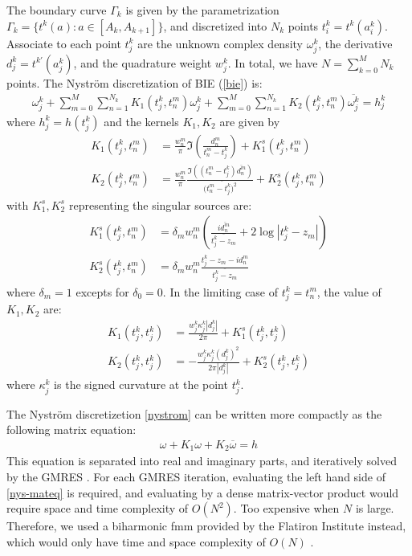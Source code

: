 \documentclass[10pt,twocolumn]{article}
\begin{document}
The boundary curve $\Gamma_k$ is given by the parametrization $\Gamma_k = \{ t^k(a): a\in \left[A_k,A_{k+1}\right]\}$, 
and discretized into $N_k$ points $t^k_i = t^k(a^k_i)$. 
Associate to each point $t^k_j$ are the unknown complex density $\omega^k_j$, 
the derivative $d^k_j = t^{k\prime}(a^k_j)$, 
and the quadrature weight $w^k_j$. In total, we have $N= \sum_{k=0}^M N_k$ points. The Nystr\"om discretization of BIE (\ref{bie}) is:
\begin{align}
  \omega_j^k 
  + \sum_{m=0}^{M}\sum_{n=1}^{N_k} K_1(t^k_j,t^m_n) \omega^k_j 
  + \sum_{m=0}^{M}\sum_{n=1}^{N_k} K_2(t^k_j,t^m_n) \overline{\omega^k_j} = h^k_j
  \label{nystrom}
\end{align} where $h^k_j = h(t^k_j)$ and the kernels $K_1, K_2$ are given by 
\begin{align}
  K_1(t^k_j, t^m_n) 
  &= \frac{w^m_n}{\pi} \Im (\frac{d^m_n}{t^m_n-t^k_j}) + K_1^s(t^k_j,t^m_n)\\
  K_2(t^k_j, t^m_n) 
  &= \frac{w^m_n}{\pi} \frac{\Im((t^m_n-t^k_j)\overline{d^m_n})}{(\overline{t^m_n - t^k_j)^2}}  + K_2^s(t^k_j,t^m_n)
\end{align}
with $K_1^s, K_2^s$ representing the singular sources are: 
\begin{align}
  K_1^s(t^k_j,t^m_n) &= \delta_m w^m_n \left(\frac{i\overline{d^m_n}}{\overline{t^k_j - z_m}}
  + 2 \log |t^k_j - z_m| \right)\\
  K_2^s(t^k_j,t^m_n) &= \delta_{m}w^m_n \frac{t^k_j-z_m-id^m_n}{\overline{t^k_j - z_m}}
\end{align}
where $\delta_m = 1$ excepts for $\delta_0 = 0$. In the limiting case of $t^k_j = t^m_n$, the value of $K_1,K_2$ are:
\begin{align}
  K_1(t^k_j, t^k_j) &= \frac{w^k_j \kappa^k_j|d^k_j|}{2\pi} + K_1^s(t^k_j,t^k_j) \\
  K_2(t^k_j, t^k_j) &= -\frac{w^k_j\kappa^k_j(d^k_j)^2}{2\pi|d^k_j|} + K_2^s(t^k_j,t^k_j)
\end{align}where $\kappa^k_j$ is the signed curvature at the point $t^k_j$. 

The Nystr\"om discretizetion \eqref{nystrom} can be written more compactly as the following matrix equation:
\begin{align}
    \omega + K_1\omega + K_2\overline{\omega} = h \label{nys-mateq}
\end{align}
This equation is separated into real and imaginary parts, and iteratively solved by the GMRES \cite{saadGMRESGeneralizedMinimal1986}. 
For each GMRES iteration, evaluating the left hand side of \eqref{nys-mateq} 
is required, and evaluating by a dense matrix-vector product would require space and time complexity of $O(N^2)$. Too expensive when $N$ is large. Therefore, we used a biharmonic fmm provided by the Flatiron Institute instead, which would only have time and space complexity of $O(N)$ \cite{FlatironinstituteFmm2d2022}. 
\end{document}
